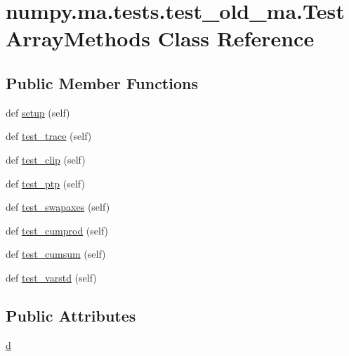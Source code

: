 \hypertarget{classnumpy_1_1ma_1_1tests_1_1test__old__ma_1_1TestArrayMethods}{}\section{numpy.\+ma.\+tests.\+test\+\_\+old\+\_\+ma.\+Test\+Array\+Methods Class Reference}
\label{classnumpy_1_1ma_1_1tests_1_1test__old__ma_1_1TestArrayMethods}
\subsection*{Public Member Functions}
\begin{DoxyCompactItemize}
\item 
def \hyperlink{classnumpy_1_1ma_1_1tests_1_1test__old__ma_1_1TestArrayMethods_afa57cbadd42034d7ea6680a53c92332f}{setup} (self)
\item 
def \hyperlink{classnumpy_1_1ma_1_1tests_1_1test__old__ma_1_1TestArrayMethods_a46335065dedc25268c92a5f0af21d0dd}{test\+\_\+trace} (self)
\item 
def \hyperlink{classnumpy_1_1ma_1_1tests_1_1test__old__ma_1_1TestArrayMethods_a0354c4c96d8d38328698595b4d0072b0}{test\+\_\+clip} (self)
\item 
def \hyperlink{classnumpy_1_1ma_1_1tests_1_1test__old__ma_1_1TestArrayMethods_a680b6db915a561632f87bead78605c33}{test\+\_\+ptp} (self)
\item 
def \hyperlink{classnumpy_1_1ma_1_1tests_1_1test__old__ma_1_1TestArrayMethods_aa37bfb69222d935e80cd421647decd22}{test\+\_\+swapaxes} (self)
\item 
def \hyperlink{classnumpy_1_1ma_1_1tests_1_1test__old__ma_1_1TestArrayMethods_a782a79240458014a87699cd931464ed5}{test\+\_\+cumprod} (self)
\item 
def \hyperlink{classnumpy_1_1ma_1_1tests_1_1test__old__ma_1_1TestArrayMethods_a279781986f14fd15f57521161b01d1ce}{test\+\_\+cumsum} (self)
\item 
def \hyperlink{classnumpy_1_1ma_1_1tests_1_1test__old__ma_1_1TestArrayMethods_a2da38606625c3ebb2fe620ffdbd78cab}{test\+\_\+varstd} (self)
\end{DoxyCompactItemize}
\subsection*{Public Attributes}
\begin{DoxyCompactItemize}
\item 
\hyperlink{classnumpy_1_1ma_1_1tests_1_1test__old__ma_1_1TestArrayMethods_a4a6286d47455cf911ff482c1eb9d3f35}{d}
\end{DoxyCompactItemize}


